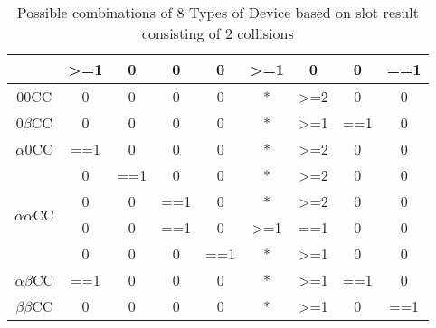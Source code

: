 \documentclass[fleqn]{article}
\begin{document}
\begin{table}[]
\begin{tabular}{|c|c|c|c|c|c|c|c|c|}
                                    & \textgreater{}=1 & 0                & 0   & 0   & \textgreater{}=1 & 0                & 0   & ==1 \\ \hline
00CC                                & 0                & 0                & 0   & 0   & *                & \textgreater{}=2 & 0   & 0   \\ \hline
0$\beta$CC                          & 0                & 0                & 0   & 0   & *                & \textgreater{}=1 & ==1 & 0   \\ \hline
$\alpha$0CC                         & ==1              & 0                & 0   & 0   & *                & \textgreater{}=2 & 0   & 0   \\ \hline
\multirow{4}{*}{$\alpha$$\alpha$CC} & 0                & ==1              & 0   & 0   & *                & \textgreater{}=2 & 0   & 0   \\ \cline{2-9} 
                                    & 0                & 0                & ==1 & 0   & *                & \textgreater{}=2 & 0   & 0   \\ \cline{2-9} 
                                    & 0                & 0                & ==1 & 0   & \textgreater{}=1 & ==1              & 0   & 0   \\ \cline{2-9} 
                                    & 0                & 0                & 0   & ==1 & *                & \textgreater{}=1 & 0   & 0   \\ \hline
$\alpha$$\beta$CC                   & ==1              & 0                & 0   & 0   & *                & \textgreater{}=1 & ==1 & 0   \\ \hline
$\beta$$\beta$CC                    & 0                & 0                & 0   & 0   & *                & \textgreater{}=1 & 0   & ==1 \\ \hline
\end{tabular}
\caption{Possible combinations of 8 Types of Device based on slot result consisting of 2 collisions}
\label{Tab8_2C}
\end{table}
\end{document}
